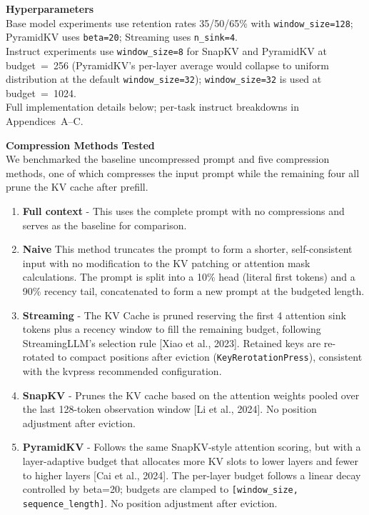 \documentclass[10pt,letterpaper]{article}
\begin{document}
\textbf{Hyperparameters}
\\Base model experiments use retention rates 35/50/65\% with \texttt{window\_size=128}; PyramidKV uses \texttt{beta=20}; Streaming uses \texttt{n\_sink=4}.
\\Instruct experiments use \texttt{window\_size=8} for SnapKV and PyramidKV at budget~=~256 
(PyramidKV's per-layer average would collapse to uniform distribution at the default 
\texttt{window\_size=32}); \texttt{window\_size=32} is used at budget~=~1024.
\\Full implementation details below; per-task instruct breakdowns in Appendices~A--C.

\textbf{Compression Methods Tested}
\\We benchmarked the baseline uncompressed prompt and five compression methods,
one of which compresses the input prompt while the remaining four all prune the KV
cache after prefill.

\begin{enumerate}
\item 
\textbf{Full context} - This uses the 
complete prompt with no compressions and serves as the baseline for comparison.

\item
\textbf{Naive} This method truncates the prompt
to form a shorter, self-consistent input with no modification to the KV patching or
attention mask calculations. The prompt is split into a 10\% head (literal first tokens)
and a 90\% recency tail, concatenated to form a new prompt at the budgeted length.

\item
\textbf{Streaming} - The KV Cache is pruned reserving the first 4 attention sink tokens plus a
recency window to fill the remaining budget, following StreamingLLM’s selection rule [Xiao et
al., 2023]. Retained keys are re-rotated to compact positions after eviction
(\texttt{KeyRerotationPress}), consistent with the kvpress recommended configuration.

\item
\textbf{SnapKV} - Prunes the KV cache based on the attention weights pooled over the last 128-token
observation window {[}Li et al., 2024{]}. No position adjustment after eviction.

\item
\textbf{PyramidKV} - Follows the same SnapKV-style attention scoring, but with a layer-adaptive
budget that allocates more KV slots to lower layers and fewer to higher layers [Cai et al., 2024].
The per-layer budget follows a linear decay controlled by beta=20; budgets are clamped to
\texttt{[window\_size, sequence\_length]}. No position adjustment after eviction.


\end{enumerate}
\end{document}
